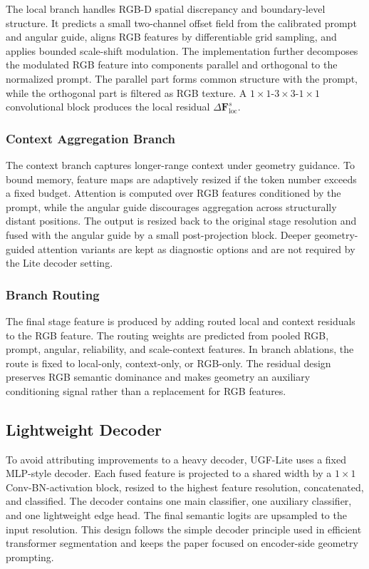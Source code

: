 \documentclass[a4paper,fleqn]{cas-dc}
\begin{document}
The local branch handles RGB-D spatial discrepancy and boundary-level structure. It predicts a small two-channel offset field from the calibrated prompt and angular guide, aligns RGB features by differentiable grid sampling, and applies bounded scale-shift modulation. The implementation further decomposes the modulated RGB feature into components parallel and orthogonal to the normalized prompt. The parallel part forms common structure with the prompt, while the orthogonal part is filtered as RGB texture. A $1\times1$-$3\times3$-$1\times1$ convolutional block produces the local residual $\Delta\mathbf{F}_{\mathrm{loc}}^{s}$.

\subsubsection{Context Aggregation Branch}

The context branch captures longer-range context under geometry guidance. To bound memory, feature maps are adaptively resized if the token number exceeds a fixed budget. Attention is computed over RGB features conditioned by the prompt, while the angular guide discourages aggregation across structurally distant positions. The output is resized back to the original stage resolution and fused with the angular guide by a small post-projection block. Deeper geometry-guided attention variants are kept as diagnostic options and are not required by the Lite decoder setting.

\subsubsection{Branch Routing}

The final stage feature is produced by adding routed local and context residuals to the RGB feature. The routing weights are predicted from pooled RGB, prompt, angular, reliability, and scale-context features. In branch ablations, the route is fixed to local-only, context-only, or RGB-only. The residual design preserves RGB semantic dominance and makes geometry an auxiliary conditioning signal rather than a replacement for RGB features.

\subsection{Lightweight Decoder}

To avoid attributing improvements to a heavy decoder, UGF-Lite uses a fixed MLP-style decoder. Each fused feature is projected to a shared width by a $1\times1$ Conv-BN-activation block, resized to the highest feature resolution, concatenated, and classified. The decoder contains one main classifier, one auxiliary classifier, and one lightweight edge head. The final semantic logits are upsampled to the input resolution. This design follows the simple decoder principle used in efficient transformer segmentation \citep{xie2021segformer} and keeps the paper focused on encoder-side geometry prompting.
\end{document}
